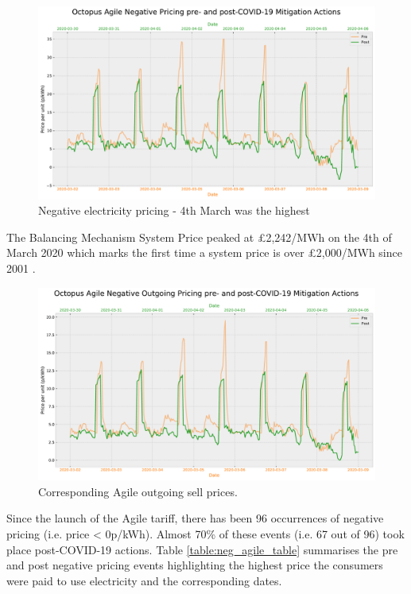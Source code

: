 \documentclass[energies,article,submit,moreauthors,pdftex]{Definitions/mdpi}
\begin{document}
\begin{figure}[H]\centering
\hspace{-25pt}\includegraphics[width=15 cm]{Graphics/Pre-post_Agilecomp_negative.pdf}
\caption{Negative electricity pricing - 4th March was the highest }\label{fig:neg_agile_comp_prepost}
\end{figure}  

The Balancing Mechanism System Price peaked at £2,242/MWh on the 4th of March 2020 which marks the first time a system price is over £2,000/MWh since 2001 \cite{ELEXON2020ELEXONBMRS}. 

\begin{figure}[H]\centering
\hspace{-25pt}\includegraphics[width=15 cm]{Graphics/Pre-post_AgileOUTGO_negative_comp.pdf}
\caption{Corresponding Agile outgoing sell prices.}\label{fig:neg_agile_comp_prepost}
\end{figure}  

Since the launch of the Agile tariff, there has been 96 occurrences of negative pricing (i.e. price < 0p/kWh). Almost 70\% of these events (i.e. 67 out of 96) took place post-COVID-19 actions. Table \ref{table:neg_agile_table} summarises the pre and post negative pricing events highlighting the highest price the consumers were paid to use electricity and the corresponding dates.
\end{document}
